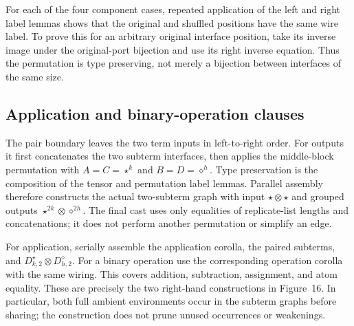 



For each of the four component cases, repeated application of the left
and right label lemmas shows that the original and shuffled positions have
the same wire label. To prove this for an arbitrary original interface
position, take its inverse image under the original-port bijection and
use its right inverse equation. Thus the permutation is type preserving,
not merely a bijection between interfaces of the same size.



\subsection{Application and binary-operation clauses}

The pair boundary leaves the two term inputs in left-to-right order.
For outputs it first concatenates the two subterm interfaces, then applies
the middle-block permutation with $A=C=\star^k$ and $B=D=\diamond^h$.
Type preservation is the composition of the tensor and permutation label
lemmas. Parallel assembly therefore constructs the actual two-subterm graph
with input $\star\otimes\star$ and grouped outputs
$\star^{2k}\otimes\diamond^{2h}$. The final cast uses only equalities of
replicate-list lengths and concatenations; it does not perform another
permutation or simplify an edge.



For application, serially assemble the application corolla, the paired
subterms, and $D^{\star}_{k,2}\otimes D^{\diamond}_{h,2}$. For a binary
operation use the corresponding operation corolla with the same wiring.
This covers addition, subtraction, assignment, and atom equality. These
are precisely the two right-hand constructions in Figure~16. In particular,
both full ambient environments occur in the subterm graphs before sharing;
the construction does not prune unused occurrences or weakenings.

